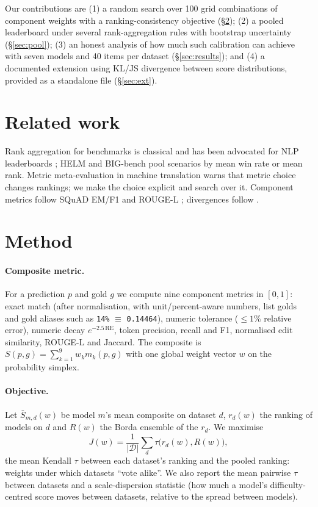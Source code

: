 \documentclass[10pt,twocolumn]{article}
\begin{document}
Our contributions are (1) a random search over 100 grid combinations of component weights with a ranking-consistency objective (\S\ref{sec:method}); (2) a pooled leaderboard under several rank-aggregation rules with bootstrap uncertainty (\S\ref{sec:pool}); (3) an honest analysis of how much such calibration can achieve with seven models and 40 items per dataset (\S\ref{sec:results}); and (4) a documented extension using KL/JS divergence between score distributions, provided as a standalone file (\S\ref{sec:ext}).

\section{Related work}
Rank aggregation for benchmarks is classical \cite{dwork2001rank,young1978consistent,cormack2009rrf} and has been advocated for NLP leaderboards \cite{colombo2022ranking}; HELM \cite{liang2022helm} and BIG-bench \cite{srivastava2023bigbench} pool scenarios by mean win rate or mean rank. Metric meta-evaluation in machine translation \cite{mathur2020tangled,freitag2021experts} warns that metric choice changes rankings; we make the choice explicit and search over it. Component metrics follow SQuAD EM/F1 \cite{rajpurkar2016squad} and ROUGE-L \cite{lin2004rouge}; divergences follow \cite{lin1991divergence}.

\section{Method}\label{sec:method}
\paragraph{Composite metric.} For a prediction $p$ and gold $g$ we compute nine component metrics in $[0,1]$: exact match (after normalisation, with unit/percent-aware numbers, list golds and gold aliases such as \texttt{14\%} $\equiv$ \texttt{0.14464}), numeric tolerance ($\le 1\%$ relative error), numeric decay $e^{-2.5\,\mathrm{RE}}$, token precision, recall and F1, normalised edit similarity, ROUGE-L and Jaccard. The composite is $S(p,g)=\sum_{k=1}^{9} w_k m_k(p,g)$ with one global weight vector $w$ on the probability simplex.
\paragraph{Objective.} Let $\bar S_{m,d}(w)$ be model $m$'s mean composite on dataset $d$, $r_d(w)$ the ranking of models on $d$ and $R(w)$ the Borda ensemble of the $r_d$. We maximise
\begin{equation}
J(w)=\frac{1}{|\mathcal D|}\sum_{d}\tau\big(r_d(w),R(w)\big),
\end{equation}
the mean Kendall $\tau$ between each dataset's ranking and the pooled ranking: weights under which datasets ``vote alike''. We also report the mean pairwise $\tau$ between datasets and a scale-dispersion statistic (how much a model's difficulty-centred score moves between datasets, relative to the spread between models).
\end{document}

